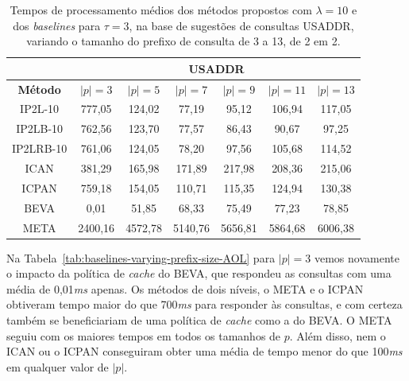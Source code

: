 \begin{table}[h]
\centering
\begin{tabular}{c|c|c|c|c|c|c|}
\cline{2-7}
\multicolumn{1}{l|}{} & \multicolumn{6}{c|}{\textbf{USADDR}} \\ \hline
\multicolumn{1}{|c|}{\textbf{Método}} & $|p| =  3$ & $|p| =  5$ & $|p| =  7$ & $|p| =  9$ & $|p| =  11$ & $|p| =  13$ \\ \hline
\multicolumn{1}{|c|}{IP2L-10} & 777,05 & 124,02 & 77,19 & 95,12 & 106,94 & 117,05 \\ \hline
\multicolumn{1}{|c|}{IP2LB-10} & 762,56 & 123,70 & 77,57 & 86,43 & 90,67 & 97,25 \\ \hline
\multicolumn{1}{|c|}{IP2LRB-10} & 761,06 & 124,05 & 78,20 & 97,56 & 105,68 & 114,52 \\ \hline
\multicolumn{1}{|c|}{ICAN} & 381,29 & 165,98 & 171,89 & 217,98 & 208,36 & 215,06 \\ \hline
\multicolumn{1}{|c|}{ICPAN} & 759,18 & 154,05 & 110,71 & 115,35 & 124,94 & 130,38 \\ \hline
\multicolumn{1}{|c|}{BEVA} & 0,01 & 51,85 & 68,33 & 75,49 & 77,23 & 78,85 \\ \hline
\multicolumn{1}{|c|}{META} & 2400,16 & 4572,78 & 5140,76 & 5656,81 & 5864,68 & 6006,38 \\ \hline
\end{tabular}
\caption{Tempos de processamento médios dos métodos propostos com $\lambda=10$ e dos \textit{baselines} para $\tau=3$, na base de sugestões de consultas USADDR, variando o tamanho do prefixo de consulta de 3 a 13, de 2 em 2.}
\label{tab:baselines-varying-prefix-size-USADDR}
\end{table}

Na Tabela~\ref{tab:baselines-varying-prefix-size-AOL} para $|p|=3$ vemos novamente o impacto da política de \textit{cache} do BEVA, que respondeu as consultas com uma média de 0,01\textit{ms} apenas. Os métodos de dois níveis, o META e o ICPAN obtiveram tempo maior do que 700\textit{ms} para responder às consultas, e com certeza também se beneficiariam de uma política de \textit{cache} como a do BEVA. O META seguiu com os maiores tempos em todos os tamanhos de $p$. Além disso, nem o ICAN ou o ICPAN conseguiram obter uma média de tempo menor do que 100\textit{ms} em qualquer valor de $|p|$. 

